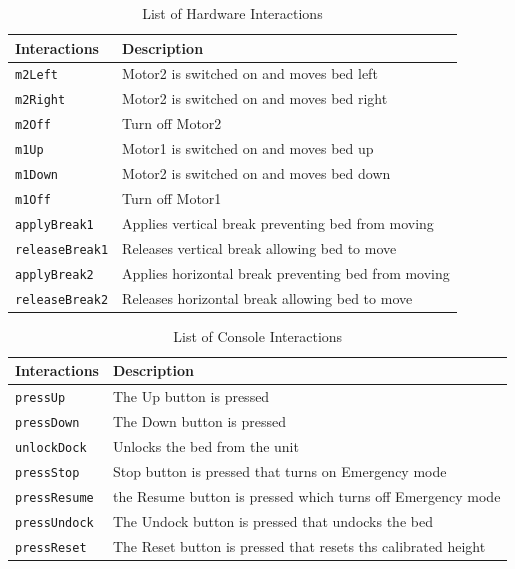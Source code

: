 \documentclass{article}
\begin{document}
\begin{table}[!h]
\centering
\begin{tabular}{ |l|l| } 
	\hline
	\textbf{Interactions} & \textbf{Description}\\
	\hline
    \texttt{m2Left} & Motor2 is switched on and moves bed left\\
    \texttt{m2Right} & Motor2 is switched on and moves bed right\\
	\texttt{m2Off} & Turn off Motor2\\
	\texttt{m1Up} & Motor1 is switched on and moves bed up\\
    \texttt{m1Down} & Motor2 is switched on and moves bed down\\
    \texttt{m1Off} & Turn off Motor1\\
	\texttt{applyBreak1} & Applies vertical break preventing bed from moving\\
	\texttt{releaseBreak1} & Releases vertical break allowing bed to move\\
	\texttt{applyBreak2} & Applies horizontal break preventing bed from moving\\
	\texttt{releaseBreak2} & Releases horizontal break allowing bed to move\\
	\hline
\end{tabular}
\caption{List of Hardware Interactions}
\label{table:1}
\end{table}

\begin{table}[h]
\centering
\begin{tabular}{ |l|l| } 
    \hline
	\textbf{Interactions} & \textbf{Description} \\
    \hline
    \texttt{pressUp} & The Up button is pressed\\
	\texttt{pressDown} & The Down button is pressed\\
	\texttt{unlockDock} & Unlocks the bed from the unit\\
	\texttt{pressStop} & Stop button is pressed that turns on Emergency mode\\
    \texttt{pressResume} & the Resume button is pressed which turns off Emergency mode\\
	\texttt{pressUndock} & The Undock button is pressed that undocks the bed\\
	\texttt{pressReset} & The Reset button is pressed that resets ths calibrated height\\
	\hline
\end{tabular}
\caption{List of Console Interactions}
\label{table:2}
\end{table}
\end{document}

